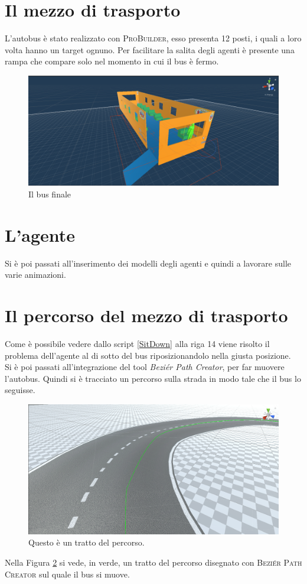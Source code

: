 \documentclass[12pt, openany]{book}
\begin{document}
	\section{Il mezzo di trasporto}
	L'autobus è stato realizzato con \textsc{ProBuilder}, esso presenta 12 posti, i quali a loro volta hanno un target ognuno. Per facilitare la salita degli agenti è presente una rampa che compare solo nel momento in cui il bus è fermo.
		\begin{figure}[H]
		\centering
		\includegraphics[width=1\linewidth]{"Immagini/BusComplete.png"}
		\caption{Il bus finale}
		\label{fig:busFinale}
	\end{figure}
	\section{L'agente}
	 Si è poi passati all'inserimento dei modelli degli agenti e quindi a lavorare sulle varie animazioni. 
	\section{Il percorso del mezzo di trasporto}
	Come è possibile vedere dallo script \ref{SitDown} alla riga 14 viene risolto il problema dell'agente al di sotto del bus riposizionandolo nella giusta posizione.\\
	Si è poi passati all'integrazione del tool \emph{Beziér Path Creator}, per far muovere l'autobus. Quindi si è tracciato un percorso sulla strada in modo tale che il bus lo seguisse.
	\begin{figure}[H]
		\centering
		\includegraphics[width=1\linewidth]{"Immagini/BezierPath.png"}
		\caption{Questo è un tratto del percorso.}
		\label{fig:BezierPath}
	\end{figure}
	Nella Figura \ref{fig:BezierPath} si vede, in verde, un tratto del percorso disegnato con \textsc{Beziér Path Creator} sul quale il bus si muove.\\
\end{document}
